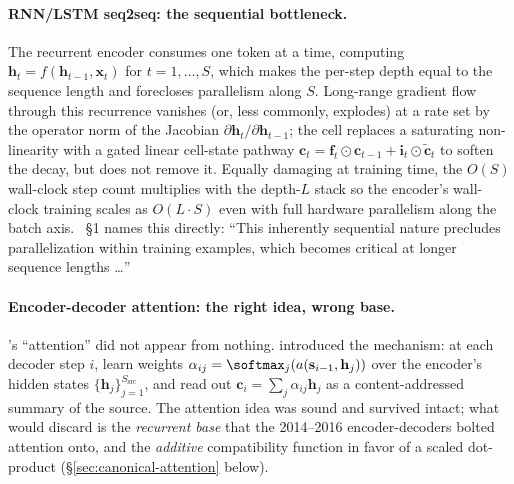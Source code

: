 \paragraph{RNN/LSTM seq2seq: the sequential bottleneck.} The
recurrent encoder consumes one token at a time, computing
$\mathbf{h}_t = f(\mathbf{h}_{t-1}, \mathbf{x}_t)$ for $t = 1, \ldots, S$,
which makes the per-step depth equal to the sequence length and
forecloses parallelism along $S$. Long-range gradient flow through
this recurrence vanishes (or, less commonly, explodes) at a rate set
by the operator norm of the Jacobian
$\partial \mathbf{h}_t / \partial \mathbf{h}_{t-1}$; the  cell
 replaces a saturating
non-linearity with a gated linear cell-state pathway
$\mathbf{c}_t = \mathbf{f}_t \odot \mathbf{c}_{t-1} + \mathbf{i}_t \odot \tilde{\mathbf{c}}_t$
to soften the decay, but does not remove it. Equally damaging at
training time, the $O(S)$ wall-clock step count multiplies with the
depth-$L$ stack so the encoder's wall-clock training scales as
$O(L \cdot S)$ even with full hardware parallelism along the batch
axis. \citet{vaswani2017}~\S 1 names this directly: ``This
inherently sequential nature precludes parallelization within
training examples, which becomes critical at longer sequence lengths
\dots''

\paragraph{Encoder-decoder attention: the right idea, wrong base.}
\citet{vaswani2017}'s ``attention'' did not appear from nothing.
 introduced
the mechanism: at each decoder step $i$, learn weights
$\alpha_{ij} = \softmax_j(a(\mathbf{s}_{i-1}, \mathbf{h}_j))$ over the
encoder's hidden states $\{\mathbf{h}_j\}_{j=1}^{S_{\text{src}}}$, and
read out $\mathbf{c}_i = \sum_j \alpha_{ij} \mathbf{h}_j$ as a
content-addressed summary of the source. The attention idea was sound
and survived intact; what \citet{vaswani2017} would discard is the
\emph{recurrent base} that the 2014--2016 encoder-decoders bolted
attention onto, and the \emph{additive} compatibility function in
favor of a scaled dot-product (\S\ref{sec:canonical-attention} below).

